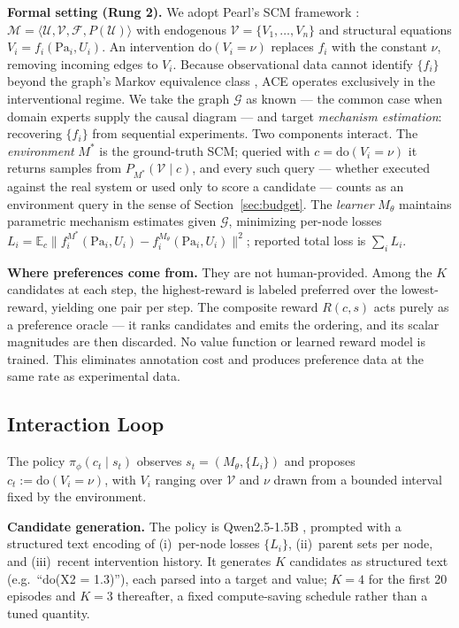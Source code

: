\documentclass[twoside]{article}
\theoremstyle{plain}
\theoremstyle{definition}
\theoremstyle{remark}
\begin{document}
\textbf{Formal setting (Rung 2).} We adopt Pearl's SCM framework \citep{pearl2009causality,pearl1995causal}: $\mathcal{M} = \langle \mathcal{U}, \mathcal{V}, \mathcal{F}, P(\mathcal{U}) \rangle$ with endogenous $\mathcal{V} = \{V_1,\ldots,V_n\}$ and structural equations $V_i = f_i(\text{Pa}_i, U_i)$. An intervention $\text{do}(V_i = \nu)$ replaces $f_i$ with the constant $\nu$, removing incoming edges to $V_i$. Because observational data cannot identify $\{f_i\}$ beyond the graph's Markov equivalence class \citep{spirtes2000causation,peters2017elements}, ACE operates exclusively in the interventional regime. We take the graph $\mathcal{G}$ as known --- the common case when domain experts supply the causal diagram --- and target \emph{mechanism estimation}: recovering $\{f_i\}$ from sequential experiments. Two components interact. The \emph{environment} $M^*$ is the ground-truth SCM; queried with $c = \text{do}(V_i=\nu)$ it returns samples from $P_{M^*}(\mathcal{V} \mid c)$, and every such query --- whether executed against the real system or used only to score a candidate --- counts as an environment query in the sense of Section~\ref{sec:budget}. The \emph{learner} $M_\theta$ maintains parametric mechanism estimates given $\mathcal{G}$, minimizing per-node losses $L_i = \mathbb{E}_{c}\|f_i^{M^*}(\text{Pa}_i,U_i) - f_i^{M_\theta}(\text{Pa}_i,U_i)\|^2$; reported total loss is $\sum_i L_i$.

\textbf{Where preferences come from.} They are not human-provided. Among the $K$ candidates at each step, the highest-reward is labeled preferred over the lowest-reward, yielding one pair per step. The composite reward $R(c,s)$ acts purely as a preference oracle --- it ranks candidates and emits the ordering, and its scalar magnitudes are then discarded. No value function or learned reward model is trained. This eliminates annotation cost and produces preference data at the same rate as experimental data.

\subsection{Interaction Loop}
\label{sec:interaction-loop}

The policy $\pi_\phi(c_t \mid s_t)$ observes $s_t = (M_\theta, \{L_i\})$ and proposes $c_t := \text{do}(V_i = \nu)$, with $V_i$ ranging over $\mathcal{V}$ and $\nu$ drawn from a bounded interval fixed by the environment.

\textbf{Candidate generation.} The policy is Qwen2.5-1.5B \citep{qwen2_5}, prompted with a structured text encoding of (i)~per-node losses $\{L_i\}$, (ii)~parent sets per node, and (iii)~recent intervention history. It generates $K$ candidates as structured text (e.g.\ ``do(X2 = 1.3)''), each parsed into a target and value; $K{=}4$ for the first 20 episodes and $K{=}3$ thereafter, a fixed compute-saving schedule rather than a tuned quantity.
\end{document}
